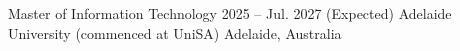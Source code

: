 \resumeEducation
  {Master of Information Technology}
  {2025 -- Jul. 2027 (Expected)}
  {Adelaide University (commenced at UniSA)}
  {Adelaide, Australia}
